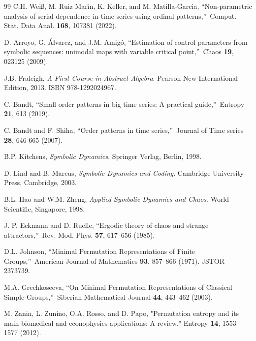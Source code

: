 \documentclass[%
 aip,
 amsmath,amssymb,
 reprint,%
]{revtex4-1}
\begin{document}
\begin{thebibliography}{99}
 C.H. Wei\ss , M. Ruiz Mar\'{\i}n, K. Keller, and M.
Matilla-Garc\'{\i}a, \textquotedblleft Non-parametric analysis of serial
dependence in time series using ordinal patterns,\textquotedblright\ Comput.
Stat. Data Anal. \textbf{168}, 107381 (2022).

 D. Arroyo, G. \'{A}lvarez, and J.M. Amig\'{o},
\textquotedblleft Estimation of control parameters from symbolic sequences: unimodal maps with variable critical point,\textquotedblright\ Chaos \textbf{19}, 023125 (2009).

 J.B. Fraleigh, \textit{A First Course in Abstract
Algebra}. Pearson New International Edition, 2013. ISBN 978-1292024967.

 C. Bandt, \textquotedblleft Small order patterns in big
time series: A practical guide,\textquotedblright\ Entropy \textbf{21}, 613
(2019). %

 C. Bandt and F. Shiha, \textquotedblleft Order patterns
in time series,\textquotedblright\ Journal of Time series \textbf{28},
646-665 (2007).

 B.P. Kitchens, \textit{Symbolic Dynamics}. Springer
Verlag, Berlin, 1998.

 D. Lind and B. Marcus, \textit{Symbolic Dynamics and
Coding}. Cambridge University Press, Cambridge, 2003.

 B.L. Hao and W.M. Zheng, \textit{Applied Symbolic Dynamics
and Chaos}. World Scientific, Singapore, 1998.

 J. P. Eckmann and D. Ruelle, \textquotedblleft Ergodic
theory of chaos and strange attractors,\textquotedblright\ Rev. Mod. Phys.
\textbf{57}, 617--656 (1985).

 D.L. Johnson, \textquotedblleft Minimal Permutation
Representations of Finite Groups,\textquotedblright\ American Journal of
Mathematics \textbf{93}, 857--866 (1971). %
JSTOR 2373739.

 M.A. Grechkoseeva, \textquotedblleft On Minimal
Permutation Representations of Classical Simple Groups,\textquotedblright\
Siberian Mathematical Journal \textbf{44}, 443--462 (2003).

 M. Zanin, L. Zunino, O.A. Rosso, and D. Papo, "Permutation entropy and its main biomedical and econophysics applications: A review," Entropy \textbf{14}, 1553--1577 (2012).


\end{thebibliography}
\end{document}
